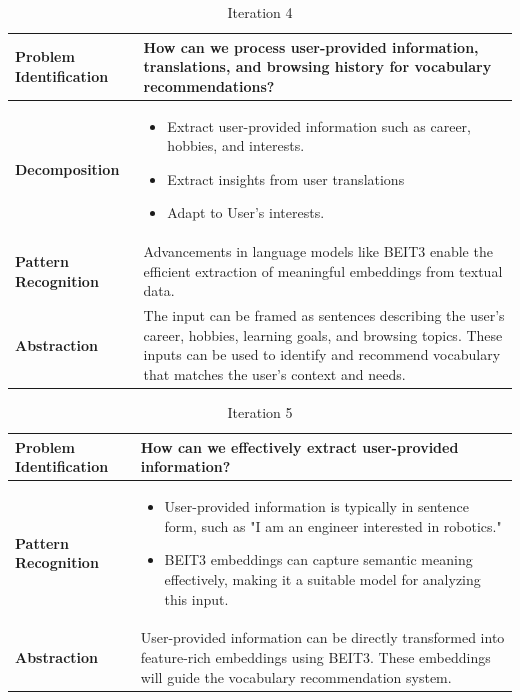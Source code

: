 \documentclass{article}
\begin{document}
\begin{table}[H]
\centering
\begin{tabular}{|p{}|p{}|}
\hline
\textbf{Problem Identification} 
&
How can we process user-provided information, translations, and browsing history for vocabulary recommendations?
\\
\hline
\textbf{Decomposition}
&
\begin{itemize}
\item Extract user-provided information such as career, hobbies, and interests.
\item Extract insights from user translations
\item Adapt to User’s interests.
\end{itemize}
\\
\hline
\textbf{Pattern Recognition}
&
Advancements in language models like BEIT3 enable the efficient extraction of meaningful embeddings from textual data.
\\
\hline
\textbf{Abstraction}
&
The input can be framed as sentences describing the user's career, hobbies, learning goals, and browsing topics. These inputs can be used to identify and recommend vocabulary that matches the user’s context and needs.
\\
\hline
\end{tabular}
\caption{Iteration 4}
\label{table:ct-thinking-iter4}
\end{table}

\begin{table}[H]
\centering
\begin{tabular}{|p{}|p{}|}
\hline
\textbf{Problem Identification} 
&
How can we effectively extract user-provided information?\\
\hline
\textbf{Pattern Recognition}
&
\begin{itemize}
\item User-provided information is typically in sentence form, such as "I am an engineer interested in robotics."
\item BEIT3 embeddings can capture semantic meaning effectively, making it a suitable model for analyzing this input.
\end{itemize}
\\
\hline
\textbf{Abstraction}
&
User-provided information can be directly transformed into feature-rich embeddings using BEIT3. These embeddings will guide the vocabulary recommendation system.
\\
\hline
\end{tabular}
\caption{Iteration 5}
\label{table:ct-thinking-iter5}
\end{table}
\end{document}
